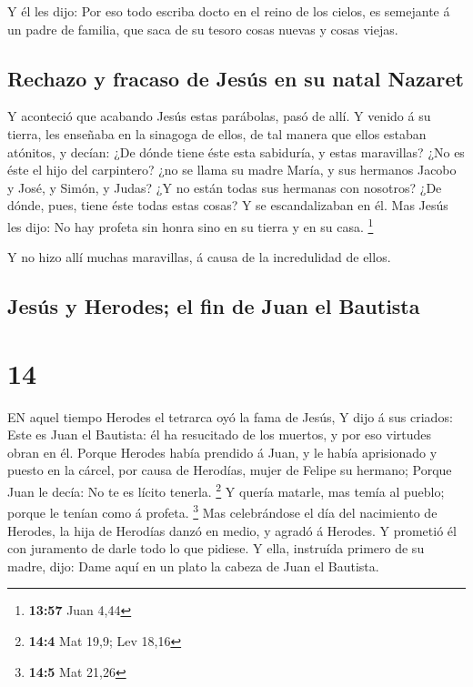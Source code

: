  Y él les dijo: Por eso todo escriba docto en el reino de
los cielos, es semejante á un padre de familia, que saca de su tesoro
cosas nuevas y cosas viejas.

\hypertarget{rechazo-y-fracaso-de-jesuxfas-en-su-natal-nazaret}{%
\subsection{Rechazo y fracaso de Jesús en su natal
Nazaret}\label{rechazo-y-fracaso-de-jesuxfas-en-su-natal-nazaret}}

 Y aconteció que acabando Jesús estas parábolas, pasó de
allí.  Y venido á su tierra, les enseñaba en la sinagoga de
ellos, de tal manera que ellos estaban atónitos, y decían: ¿De dónde
tiene éste esta sabiduría, y estas maravillas?  ¿No es éste
el hijo del carpintero? ¿no se llama su madre María, y sus hermanos
Jacobo y José, y Simón, y Judas?  ¿Y no están todas sus
hermanas con nosotros? ¿De dónde, pues, tiene éste todas estas cosas?
 Y se escandalizaban en él. Mas Jesús les dijo: No hay
profeta sin honra sino en su tierra y en su casa. \footnote{\textbf{13:57}
  Juan 4,44}

 Y no hizo allí muchas maravillas, á causa de la
incredulidad de ellos.

\hypertarget{jesuxfas-y-herodes-el-fin-de-juan-el-bautista}{%
\subsection{Jesús y Herodes; el fin de Juan el
Bautista}\label{jesuxfas-y-herodes-el-fin-de-juan-el-bautista}}

\hypertarget{section-13}{%
\section{14}\label{section-13}}

 EN aquel tiempo Herodes el tetrarca oyó la fama de Jesús,
 Y dijo á sus criados: Este es Juan el Bautista: él ha
resucitado de los muertos, y por eso virtudes obran en él. 
Porque Herodes había prendido á Juan, y le había aprisionado y puesto en
la cárcel, por causa de Herodías, mujer de Felipe su hermano;
 Porque Juan le decía: No te es lícito tenerla. \footnote{\textbf{14:4}
  Mat 19,9; Lev 18,16}  Y quería matarle, mas temía al
pueblo; porque le tenían como á profeta. \footnote{\textbf{14:5} Mat
  21,26}  Mas celebrándose el día del nacimiento de Herodes,
la hija de Herodías danzó en medio, y agradó á Herodes.  Y
prometió él con juramento de darle todo lo que pidiese.  Y
ella, instruída primero de su madre, dijo: Dame aquí en un plato la
cabeza de Juan el Bautista.

